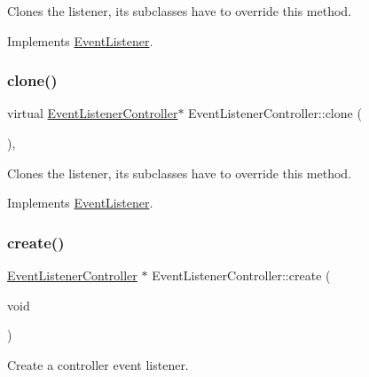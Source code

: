 Clones the listener, its subclasses have to override this method. 

Implements \hyperlink{classEventListener_a8707b41e85031f08e48def3584d51bc0}{Event\+Listener}.

\mbox{\label{classEventListenerController_a10c944bc699aac977f85d8b8bdc65e15}} 
\subsubsection{\texorpdfstring{clone()}{clone()}\hspace{0.1cm}{\footnotesize\ttfamily [2/2]}}
{\footnotesize\ttfamily virtual \hyperlink{classEventListenerController}{Event\+Listener\+Controller}$\ast$ Event\+Listener\+Controller\+::clone (\begin{DoxyParamCaption}{ }\end{DoxyParamCaption})\hspace{0.3cm}{\ttfamily [override]}, {\ttfamily [virtual]}}

Clones the listener, its subclasses have to override this method. 

Implements \hyperlink{classEventListener_a8707b41e85031f08e48def3584d51bc0}{Event\+Listener}.

\mbox{\label{classEventListenerController_ac82877a08d0ed41a51b7e27d4232fee4}} 
\subsubsection{\texorpdfstring{create()}{create()}\hspace{0.1cm}{\footnotesize\ttfamily [1/2]}}
{\footnotesize\ttfamily \hyperlink{classEventListenerController}{Event\+Listener\+Controller} $\ast$ Event\+Listener\+Controller\+::create (\begin{DoxyParamCaption}\item[{void}]{ }\end{DoxyParamCaption})\hspace{0.3cm}{\ttfamily [static]}}

Create a controller event listener.

